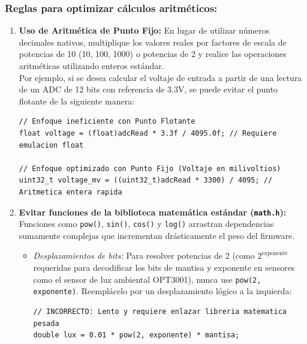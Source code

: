 \documentclass[
10pt, %
a4paper, %
oneside, %
headinclude,footinclude, %
BCOR5mm, %
]{scrartcl}
\begin{document}
\subsubsection{Reglas para optimizar cálculos aritméticos:}
\begin{enumerate}
	\item \textbf{Uso de Aritmética de Punto Fijo:} En lugar de utilizar números decimales nativos, multiplique los valores reales por factores de escala de potencias de 10 (10, 100, 1000) o potencias de 2 y realice las operaciones aritméticas utilizando enteros estándar. \\
	Por ejemplo, si se desea calcular el voltaje de entrada a partir de una lectura de un ADC de 12 bits con referencia de 3.3V, se puede evitar el punto flotante de la siguiente manera:
	\begin{lstlisting}[style=CMakeStyle]
// Enfoque ineficiente con Punto Flotante
float voltage = (float)adcRead * 3.3f / 4095.0f; // Requiere emulacion float

// Enfoque optimizado con Punto Fijo (Voltaje en milivoltios)
uint32_t voltage_mv = ((uint32_t)adcRead * 3300) / 4095; // Aritmetica entera rapida\end{lstlisting}
	
	\item \textbf{Evitar funciones de la biblioteca matemática estándar (\texttt{math.h}):} Funciones como \texttt{pow()}, \texttt{sin()}, \texttt{cos()} y \texttt{log()} arrastran dependencias sumamente complejas que incrementan drásticamente el peso del firmware.
	\begin{itemize}
		\item \textit{Desplazamientos de bits:} Para resolver potencias de 2 (como $2^{\text{exponente}}$ requeridas para decodificar los bits de mantisa y exponente en sensores como el sensor de luz ambiental OPT3001), nunca use \texttt{pow(2, exponente)}. Reemplácelo por un desplazamiento lógico a la izquierda:
		\begin{lstlisting}[style=CMakeStyle]
// INCORRECTO: Lento y requiere enlazar libreria matematica pesada
double lux = 0.01 * pow(2, exponente) * mantisa;


\end{lstlisting}
\end{itemize}
\end{enumerate}
\end{document}

